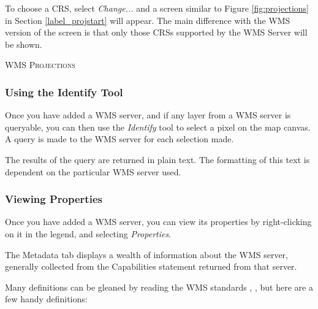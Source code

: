 To choose a CRS, select \textsl{Change...} and a screen similar to
Figure \ref{fig:projections} in Section \ref{label_projstart} will appear.
The main difference with the WMS version of the screen is that only
those CRSs supported by the WMS Server will be shown.


\begin{Tip}[h]\caption{\textsc{WMS Projections}}
\end{Tip}


\subsubsection{Using the Identify Tool}\label{sec:ogc-wms-identify}

Once you have added a WMS server, 
and if any layer from a WMS server is queryable, you can then use
the \textsl{Identify} tool to select a pixel on the map canvas.
A query is made to the WMS server for each selection made.

The results of the query are returned in plain text.
The formatting of this text is dependent on the particular
WMS server used.


\subsubsection{Viewing Properties}\label{sec:ogc-wms-properties}

Once you have added a WMS server, you can view its properties
by right-clicking on it in the legend, and selecting
\textsl{Properties}.


\label{sec:ogc-wms-properties-metadata}

The Metadata tab displays a wealth of information about the WMS server,
generally collected from the Capabilities statement returned from
that server.

Many definitions can be gleaned by reading the WMS
standards \cite{OGCWMS010101web}, \cite{OGCWMS010300web}, but
here are a few handy definitions:

